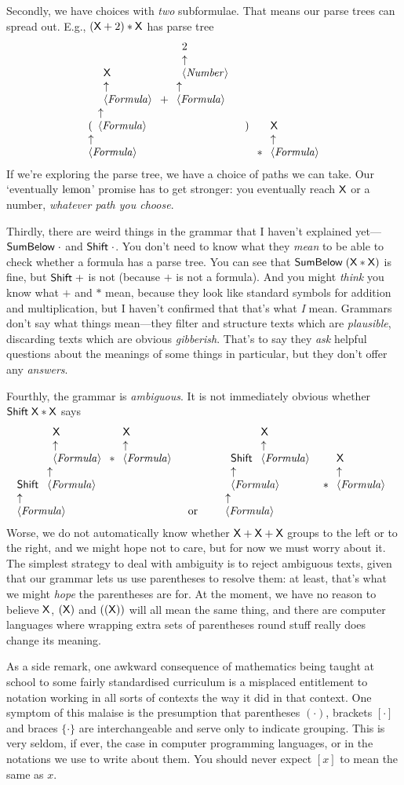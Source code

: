 \documentclass{book}
\begin{document}
Secondly, we have choices with \emph{two} subformulae. That means our parse trees can spread out. E.g., $(\X + 2)*\X$ has parse tree
\[
\nta{Formula}{(\nta{Formula}{\nta{Formula}{\X} +  \nta{Formula}{\nta{Number}{2}}})}
*
\nta{Formula}{\X}
\]
If we're exploring the parse tree, we have a choice of paths we can take. Our `eventually $\lemon$' promise has to get stronger: you eventually reach $\X$ or a number, \emph{whatever path you choose}.

Thirdly, there are weird things in the grammar that I haven't explained yet---$\SB\cdot$ and $\SH\cdot$. You don't need to know what they \emph{mean} to be able to check whether a formula has a parse tree. You can see that $\SB(\X * \X)$ is fine, but $\SH +$ is not (because $+$ is not a formula). And you might \emph{think} you know what $+$ and $*$ mean, because they look like standard symbols for addition and multiplication, but I haven't confirmed that that's what \emph{I} mean. Grammars don't say what things mean---they filter and structure texts which are \emph{plausible}, discarding texts which are obvious \emph{gibberish}. That's to say they \emph{ask} helpful questions about the meanings of some things in particular, but they don't offer any \emph{answers}.

Fourthly, the grammar is \emph{ambiguous}. It is not immediately obvious whether $\SH\X*\X$ says
\[
\nta{Formula}{\SH\nta{Formula}{\nta{Formula}{\X}*\nta{Formula}{\X}}}
\mbox{or}\qquad
\nta{Formula}{\nta{Formula}{\SH\nta{Formula}{\X}}*\nta{Formula}{\X}}
\]
Worse, we do not automatically know whether $\X+\X+\X$ groups to the left or to the right, and we might hope not to care, but for now we must worry about it. The simplest strategy to deal with ambiguity is to reject ambiguous texts, given that our grammar lets us use parentheses to resolve them: at least, that's what we might \emph{hope} the parentheses are for. At the moment, we have no reason to believe $\X$, $(\X)$ and $((\X))$ will all mean the same thing, and there are computer languages where wrapping extra sets of parentheses round stuff really does change its meaning.

As a side remark, one awkward consequence of mathematics being taught at school to some fairly standardised curriculum is a misplaced entitlement to notation working in all sorts of contexts the way it did in that context. One symptom of this malaise is the presumption that parentheses $(\cdot)$, brackets $[\cdot]$ and braces $\{\cdot\}$ are interchangeable and serve only to indicate grouping. This is very seldom, if ever, the case in computer programming languages, or in the notations we use to write about them. You should never expect $[x]$ to mean the same as $x$.
\end{document}
